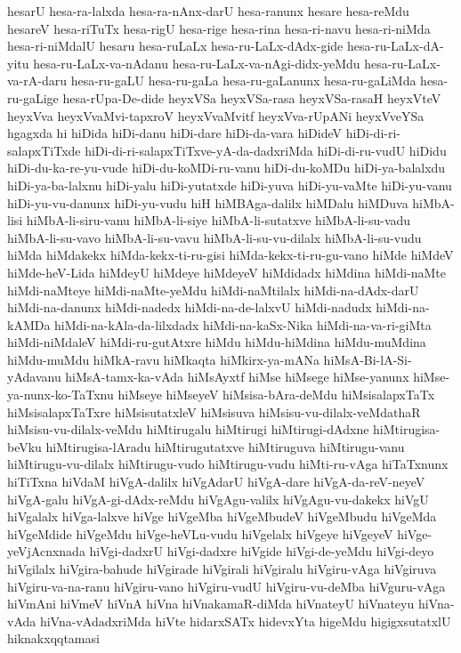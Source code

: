 {hesarU
hesa-ra-lalxda
hesa-ra-nAnx-darU
hesa-ranunx
hesare
hesa-reMdu
hesareV
hesa-riTuTx
hesa-rigU
hesa-rige
hesa-rina
hesa-ri-navu
hesa-ri-niMda
hesa-ri-niMdalU
hesaru
hesa-ruLaLx
hesa-ru-LaLx-dAdx-gide
hesa-ru-LaLx-dA-yitu
hesa-ru-LaLx-va-nAdanu
hesa-ru-LaLx-va-nAgi-didx-yeMdu
hesa-ru-LaLx-va-rA-daru
hesa-ru-gaLU
hesa-ru-gaLa
hesa-ru-gaLanunx
hesa-ru-gaLiMda
hesa-ru-gaLige
hesa-rUpa-De-dide
heyxVSa
heyxVSa-rasa
heyxVSa-rasaH
heyxVteV
heyxVva
heyxVvaMvi-tapxroV
heyxVvaMvitf
heyxVva-rUpANi
heyxVveYSa
hgagxda
hi
hiDida
hiDi-danu
hiDi-dare
hiDi-da-vara
hiDideV
hiDi-di-ri-salapxTiTxde
hiDi-di-ri-salapxTiTxve-yA-da-dadxriMda
hiDi-di-ru-vudU
hiDidu
hiDi-du-ka-re-yu-vude
hiDi-du-koMDi-ru-vanu
hiDi-du-koMDu
hiDi-ya-balalxdu
hiDi-ya-ba-lalxnu
hiDi-yalu
hiDi-yutatxde
hiDi-yuva
hiDi-yu-vaMte
hiDi-yu-vanu
hiDi-yu-vu-danunx
hiDi-yu-vudu
hiH
hiMBAga-dalilx
hiMDalu
hiMDuva
hiMbA-lisi
hiMbA-li-siru-vanu
hiMbA-li-siye
hiMbA-li-sutatxve
hiMbA-li-su-vadu
hiMbA-li-su-vavo
hiMbA-li-su-vavu
hiMbA-li-su-vu-dilalx
hiMbA-li-su-vudu
hiMda
hiMdakekx
hiMda-kekx-ti-ru-gisi
hiMda-kekx-ti-ru-gu-vano
hiMde
hiMdeV
hiMde-heV-Lida
hiMdeyU
hiMdeye
hiMdeyeV
hiMdidadx
hiMdina
hiMdi-naMte
hiMdi-naMteye
hiMdi-naMte-yeMdu
hiMdi-naMtilalx
hiMdi-na-dAdx-darU
hiMdi-na-danunx
hiMdi-nadedx
hiMdi-na-de-lalxvU
hiMdi-nadudx
hiMdi-na-kAMDa
hiMdi-na-kAla-da-lilxdadx
hiMdi-na-kaSx-Nika
hiMdi-na-va-ri-giMta
hiMdi-niMdaleV
hiMdi-ru-gutAtxre
hiMdu
hiMdu-hiMdina
hiMdu-muMdina
hiMdu-muMdu
hiMkA-ravu
hiMkaqta
hiMkirx-ya-mANa
hiMsA-Bi-lA-Si-yAdavanu
hiMsA-tamx-ka-vAda
hiMsAyxtf
hiMse
hiMsege
hiMse-yanunx
hiMse-ya-nunx-ko-TaTxnu
hiMseye
hiMseyeV
hiMsisa-bAra-deMdu
hiMsisalapxTaTx
hiMsisalapxTaTxre
hiMsisutatxleV
hiMsisuva
hiMsisu-vu-dilalx-veMdathaR
hiMsisu-vu-dilalx-veMdu
hiMtirugalu
hiMtirugi
hiMtirugi-dAdxne
hiMtirugisa-beVku
hiMtirugisa-lAradu
hiMtirugutatxve
hiMtiruguva
hiMtirugu-vanu
hiMtirugu-vu-dilalx
hiMtirugu-vudo
hiMtirugu-vudu
hiMti-ru-vAga
hiTaTxnunx
hiTiTxna
hiVdaM
hiVgA-dalilx
hiVgAdarU
hiVgA-dare
hiVgA-da-reV-neyeV
hiVgA-galu
hiVgA-gi-dAdx-reMdu
hiVgAgu-valilx
hiVgAgu-vu-dakekx
hiVgU
hiVgalalx
hiVga-lalxve
hiVge
hiVgeMba
hiVgeMbudeV
hiVgeMbudu
hiVgeMda
hiVgeMdide
hiVgeMdu
hiVge-heVLu-vudu
hiVgelalx
hiVgeye
hiVgeyeV
hiVge-yeVjAcnxnada
hiVgi-dadxrU
hiVgi-dadxre
hiVgide
hiVgi-de-yeMdu
hiVgi-deyo
hiVgilalx
hiVgira-bahude
hiVgirade
hiVgirali
hiVgiralu
hiVgiru-vAga
hiVgiruva
hiVgiru-va-na-ranu
hiVgiru-vano
hiVgiru-vudU
hiVgiru-vu-deMba
hiVguru-vAga
hiVmAni
hiVmeV
hiVnA
hiVna
hiVnakamaR-diMda
hiVnateyU
hiVnateyu
hiVna-vAda
hiVna-vAdadxriMda
hiVte
hidarxSATx
hidevxYta
higeMdu
higigxsutatxlU
hiknakxqqtamasi
}
